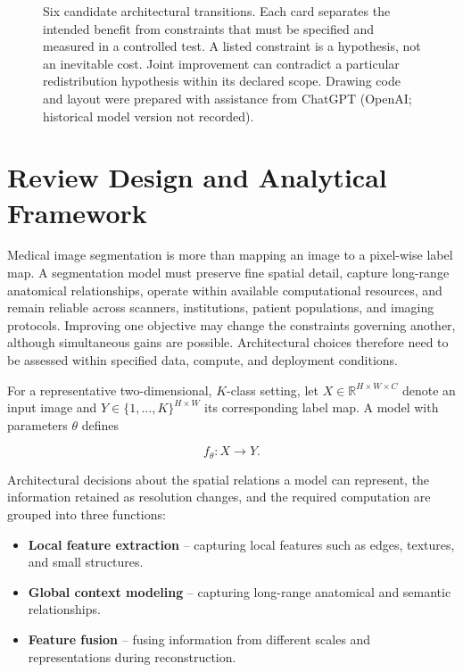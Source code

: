 \documentclass[5p,times,authoryear]{elsarticle}
\begin{document}
\begin{figure}[t]
\endgroup
\caption{Six candidate architectural transitions. Each card separates the intended benefit from constraints that must be specified and measured in a controlled test. A listed constraint is a hypothesis, not an inevitable cost. Joint improvement can contradict a particular redistribution hypothesis within its declared scope. Drawing code and layout were prepared with assistance from ChatGPT (OpenAI; historical model version not recorded).}
\label{fig:redistribution_map}
\end{figure}

\section{Review Design and Analytical Framework}
\label{sec:method}

Medical image segmentation is more than mapping an image to a pixel-wise label map. A segmentation model must preserve fine spatial detail, capture long-range anatomical relationships, operate within available computational resources, and remain reliable across scanners, institutions, patient populations, and imaging protocols. Improving one objective may change the constraints governing another, although simultaneous gains are possible. Architectural choices therefore need to be assessed within specified data, compute, and deployment conditions.

For a representative two-dimensional, $K$-class setting, let $X \in \mathbb{R}^{H \times W \times C}$ denote an input image and $Y \in \{1,\ldots,K\}^{H \times W}$ its corresponding label map. A model with parameters $\theta$ defines

\[
f_{\theta}: X \rightarrow Y.
\]

Architectural decisions about the spatial relations a model can represent, the information retained as resolution changes, and the required computation are grouped into three functions:

\begin{itemize}
    \item \textbf{Local feature extraction} – capturing local features such as edges, textures, and small structures.
    \item \textbf{Global context modeling} – capturing long-range anatomical and semantic relationships.
    \item \textbf{Feature fusion} – fusing information from different scales and representations during reconstruction.
\end{itemize}
\end{document}
